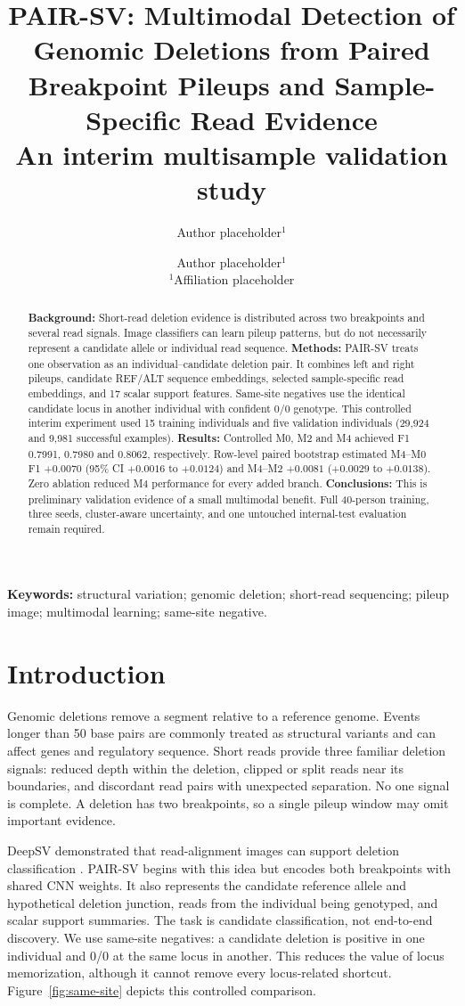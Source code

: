 \documentclass[10pt,twocolumn]{article}
\title{PAIR-SV: Multimodal Detection of Genomic Deletions from Paired Breakpoint Pileups and Sample-Specific Read Evidence\\\large An interim multisample validation study}
\author{Author placeholder$^1$ \and Author placeholder$^1$\\$^1$Affiliation placeholder}
\date{}
\begin{document}
\maketitle

\begin{abstract}
\textbf{Background:} Short-read deletion evidence is distributed across two breakpoints and several read signals. Image classifiers can learn pileup patterns, but do not necessarily represent a candidate allele or individual read sequence. \textbf{Methods:} PAIR-SV treats one observation as an individual--candidate deletion pair. It combines left and right pileups, candidate REF/ALT sequence embeddings, selected sample-specific read embeddings, and 17 scalar support features. Same-site negatives use the identical candidate locus in another individual with confident 0/0 genotype. This controlled interim experiment used 15 training individuals and five validation individuals (29,924 and 9,981 successful examples). \textbf{Results:} Controlled M0, M2 and M4 achieved F1 0.7991, 0.7980 and 0.8062, respectively. Row-level paired bootstrap estimated M4--M0 F1 $+0.0070$ (95\% CI $+0.0016$ to $+0.0124$) and M4--M2 $+0.0081$ ($+0.0029$ to $+0.0138$). Zero ablation reduced M4 performance for every added branch. \textbf{Conclusions:} This is preliminary validation evidence of a small multimodal benefit. Full 40-person training, three seeds, cluster-aware uncertainty, and one untouched internal-test evaluation remain required.
\end{abstract}
\noindent\textbf{Keywords:} structural variation; genomic deletion; short-read sequencing; pileup image; multimodal learning; same-site negative.

\section{Introduction}
Genomic deletions remove a segment relative to a reference genome. Events longer than 50 base pairs are commonly treated as structural variants and can affect genes and regulatory sequence. Short reads provide three familiar deletion signals: reduced depth within the deletion, clipped or split reads near its boundaries, and discordant read pairs with unexpected separation. No one signal is complete. A deletion has two breakpoints, so a single pileup window may omit important evidence.

DeepSV demonstrated that read-alignment images can support deletion classification \cite{cai2019}. PAIR-SV begins with this idea but encodes both breakpoints with shared CNN weights. It also represents the candidate reference allele and hypothetical deletion junction, reads from the individual being genotyped, and scalar support summaries. The task is candidate classification, not end-to-end discovery. We use same-site negatives: a candidate deletion is positive in one individual and 0/0 at the same locus in another. This reduces the value of locus memorization, although it cannot remove every locus-related shortcut. Figure~\ref{fig:same-site} depicts this controlled comparison.
\end{document}
